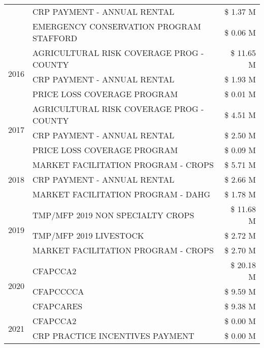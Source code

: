 \begin{tabular}{llr}
 & CRP PAYMENT - ANNUAL RENTAL & \$ 1.37 M \\
 & EMERGENCY CONSERVATION PROGRAM STAFFORD & \$ 0.06 M \\
\cline{1-3}
\multirow[t]{3}{*}{2016} & AGRICULTURAL RISK COVERAGE PROG - COUNTY & \$ 11.65 M \\
 & CRP PAYMENT - ANNUAL RENTAL & \$ 1.93 M \\
 & PRICE LOSS COVERAGE PROGRAM & \$ 0.01 M \\
\cline{1-3}
\multirow[t]{3}{*}{2017} & AGRICULTURAL RISK COVERAGE PROG - COUNTY & \$ 4.51 M \\
 & CRP PAYMENT - ANNUAL RENTAL & \$ 2.50 M \\
 & PRICE LOSS COVERAGE PROGRAM & \$ 0.09 M \\
\cline{1-3}
\multirow[t]{3}{*}{2018} & MARKET FACILITATION PROGRAM - CROPS & \$ 5.71 M \\
 & CRP PAYMENT - ANNUAL RENTAL & \$ 2.66 M \\
 & MARKET FACILITATION PROGRAM - DAHG & \$ 1.78 M \\
\cline{1-3}
\multirow[t]{3}{*}{2019} & TMP/MFP 2019 NON SPECIALTY CROPS & \$ 11.68 M \\
 & TMP/MFP 2019 LIVESTOCK & \$ 2.72 M \\
 & MARKET FACILITATION PROGRAM - CROPS & \$ 2.70 M \\
\cline{1-3}
\multirow[t]{3}{*}{2020} & CFAPCCA2 & \$ 20.18 M \\
 & CFAPCCCCA & \$ 9.59 M \\
 & CFAPCARES & \$ 9.38 M \\
\cline{1-3}
\multirow[t]{2}{*}{2021} & CFAPCCA2 & \$ 0.00 M \\
 & CRP PRACTICE INCENTIVES PAYMENT & \$ 0.00 M \\
\cline{1-3}
\bottomrule
\end{tabular}
